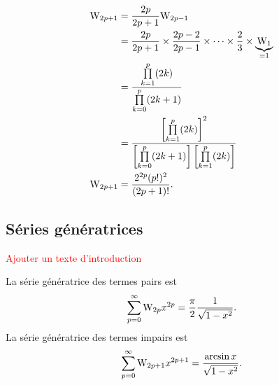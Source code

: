 \begin{preuve}
\begin{figure*}[h!]
\begin{multicols}{2}
\begin{align*}
    \mathrm{W}_{2p+1} &= \frac{2p}{2p+1} \mathrm{W}_{2p-1} \\
    &= \frac{2p}{2p+1} \times \frac{2p-2}{2p-1} \times \cdots \times \frac{2}{3} \times \underbrace{\mathrm{W}_1}_{=1} \\
    &= \frac{\prod\limits_{k=1}^p (2k)}{\prod\limits_{k=0}^p (2k+1)} \\
    &= \frac{\left[ \prod\limits_{k=1}^p (2k) \right]^2}{\left[ \prod\limits_{k=0}^p (2k+1) \right] \left[ \prod\limits_{k=1}^p (2k) \right]} \\
    \mathrm{W}_{2p+1} &= \frac{2^{2p}(p!)^2}{(2p+1)!}.
\end{align*}
\end{multicols}
\end{figure*}
\end{preuve}

\subsection{Séries génératrices}


\textcolor{red}{Ajouter un texte d'introduction}

\begin{prop}{}
    La série génératrice des termes pairs est 
    $$\sum_{p=0}^\infty \mathrm{W}_{2p} x^{2p} = \frac{\pi}{2} \frac{1}{\sqrt{1-x^2}}.$$
    La série génératrice des termes impairs est 
    $$\sum_{p=0}^\infty \mathrm{W}_{2p+1} x^{2p+1} = \frac{\arcsin x}{\sqrt{1-x^2}}.$$
\end{prop}

